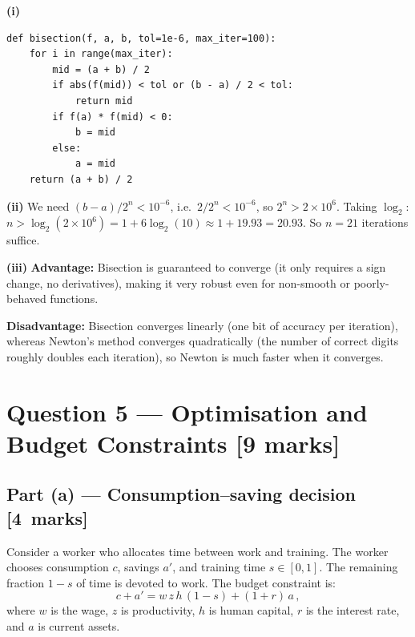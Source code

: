 \documentclass[11pt,a4paper]{article}
\newcommand{\mkpts}[1]{\hfill\textbf{[#1~marks]}}
\begin{document}
\begin{solution}
\textbf{(i)}
\begin{lstlisting}[numbers=none]
def bisection(f, a, b, tol=1e-6, max_iter=100):
    for i in range(max_iter):
        mid = (a + b) / 2
        if abs(f(mid)) < tol or (b - a) / 2 < tol:
            return mid
        if f(a) * f(mid) < 0:
            b = mid
        else:
            a = mid
    return (a + b) / 2
\end{lstlisting}

\textbf{(ii)} We need $(b-a)/2^n < 10^{-6}$, i.e.\ $2/2^n < 10^{-6}$, so $2^n > 2\times 10^6$.  Taking $\log_2$: $n > \log_2(2\times 10^6) = 1 + 6\log_2(10) \approx 1 + 19.93 = 20.93$.  So $\boxed{n = 21}$ iterations suffice.

\medskip

\textbf{(iii)} \textbf{Advantage:} Bisection is guaranteed to converge (it only requires a sign change, no derivatives), making it very robust even for non-smooth or poorly-behaved functions.

\textbf{Disadvantage:} Bisection converges linearly (one bit of accuracy per iteration), whereas Newton's method converges quadratically (the number of correct digits roughly doubles each iteration), so Newton is much faster when it converges.
\end{solution}


\newpage

\section*{Question 5 --- Optimisation and Budget Constraints \hfill [9 marks]}

\subsection*{Part (a) --- Consumption--saving decision \mkpts{4}}

Consider a worker who allocates time between work and training.  The worker chooses consumption $c$, savings $a'$, and training time $s \in [0,1]$.  The remaining fraction $1-s$ of time is devoted to work.  The budget constraint is:
\[
c + a' = w\,z\,h\,(1-s) + (1+r)\,a\,,
\]
where $w$ is the wage, $z$ is productivity, $h$ is human capital, $r$ is the interest rate, and $a$ is current assets.
\end{document}
